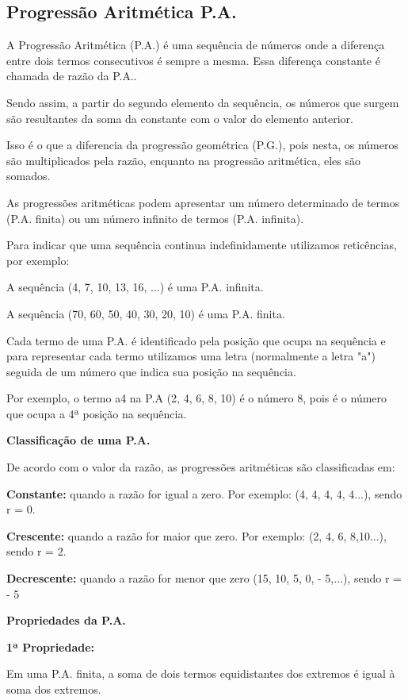 \begin{multicols*}{2}
    \subsection{Progressão Aritmética P.A.}

    A Progressão Aritmética (P.A.) é uma sequência de números onde a diferença entre dois termos consecutivos é sempre a mesma. Essa diferença constante é chamada de razão da P.A..

    Sendo assim, a partir do segundo elemento da sequência, os números que surgem são resultantes da soma da constante com o valor do elemento anterior.

    Isso é o que a diferencia da progressão geométrica (P.G.), pois nesta, os números são multiplicados pela razão, enquanto na progressão aritmética, eles são somados.

    As progressões aritméticas podem apresentar um número determinado de termos (P.A. finita) ou um número infinito de termos (P.A. infinita).

    Para indicar que uma sequência continua indefinidamente utilizamos reticências, por exemplo:

    A sequência (4, 7, 10, 13, 16, ...) é uma P.A. infinita.

    A sequência (70, 60, 50, 40, 30, 20, 10) é uma P.A. finita.

    Cada termo de uma P.A. é identificado pela posição que ocupa na sequência e para representar cada termo utilizamos uma letra (normalmente a letra "a") seguida de um número que indica sua posição na sequência.

    Por exemplo, o termo a4 na P.A (2, 4, 6, 8, 10) é o número 8, pois é o número que ocupa a 4ª posição na sequência.

    \textbf{Classificação de uma P.A.}

    De acordo com o valor da razão, as progressões aritméticas são classificadas em:

    \textbf{Constante:} quando a razão for igual a zero. Por exemplo: (4, 4, 4, 4, 4...), sendo r = 0.

    \textbf{Crescente:} quando a razão for maior que zero. Por exemplo: (2, 4, 6, 8,10...), sendo r = 2.

    \textbf{Decrescente:} quando a razão for menor que zero (15, 10, 5, 0, - 5,...), sendo r = - 5

    \textbf{Propriedades da P.A.}

    \textbf{1ª Propriedade:}

    Em uma P.A. finita, a soma de dois termos equidistantes dos extremos é igual à soma dos extremos.


\end{multicols*}
